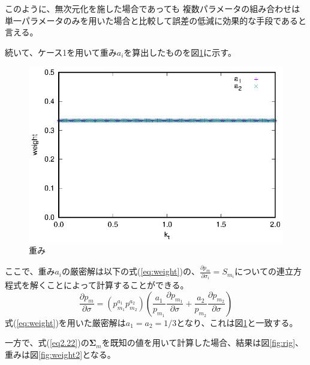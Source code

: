 \documentclass[a4paper,11pt,titlepage,uplatex]{jsreport}
\begin{document}
このように、無次元化を施した場合であっても
複数パラメータの組み合わせは単一パラメータのみを用いた場合と比較して誤差の低減に効果的な手段であると言える。

続いて、ケース1を用いて重み$a_i$を算出したものを図\ref{fig:weight}に示す。

\begin{figure}[H]
  \centering
  \includegraphics[keepaspectratio,scale=1.0]{case1_weight.eps}
  \caption{重み}
  \label{fig:weight}
\end{figure}

ここで、重み$a_i$の厳密解は以下の式(\ref{eq:weight})の、$\frac{\partial p_{m}}{\partial \sigma_i} = S_{m_i}$についての連立方程式を解くことによって計算することができる。
\begin{equation}
  \frac{\partial p_{m}}{\partial \sigma} = \left(p_{m_1}^{a_1} p_{m_2}^{a_2}\right) \left(\frac{a_1}{p_{m_1}}\frac{\partial p_{m_1}}{\partial \sigma} + \frac{a_2}{p_{m_2}}\frac{\partial p_{m_2}}{\partial \sigma} \right)
  \label{eq:weight}
\end{equation}
式(\ref{eq:weight})を用いた厳密解は$a_1 = a_2 = 1/3$となり、これは図\ref{fig:weight}と一致する。

一方で、式(\ref{eq2.22})の$\bm{\Sigma}_{m}$を既知の値を用いて計算した場合、結果は図\ref{fig:rig}、重みは図\ref{fig:weight2}となる。
\end{document}
